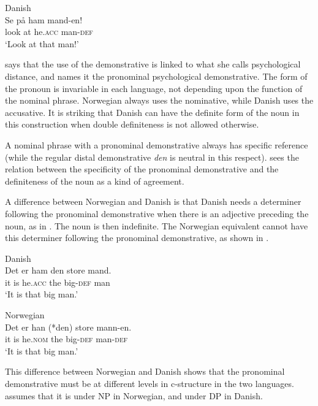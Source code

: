 \documentclass[output=paper,hidelinks]{langscibook}
\begin{document}
\ea\label{ex:Scandinavian:100} Danish \citep[193]{Strahan08}\\
\gll
 {Se} {på} {ham} {mand-en!}\\
 look at he.\textsc{acc} man-\textsc{def}\\
\glt `Look at that man!'\z

\noindent \citet{Johannessen08} says that the use of the demonstrative is linked to what she calls psychological distance, and names it the pronominal psychological demonstrative. The form of the pronoun is invariable in each language, not depending upon the function of the nominal phrase. Norwegian always uses the nominative, while Danish uses the accusative. It is striking that Danish can have the definite form of the noun in this construction when double definiteness is not allowed otherwise.

 A nominal phrase with a pronominal demonstrative always has specific reference (while the regular distal demonstrative \textit{den} is neutral in this respect). \citet{Strahan08} sees the relation between the specificity of the pronominal demonstrative and the definiteness of the noun as a kind of agreement.

 A difference between Norwegian and Danish is that Danish needs a determiner following the pronominal demonstrative when there is an adjective preceding the noun, as in . The noun is then indefinite. The Norwegian equivalent cannot have this determiner following the pronominal demonstrative, as shown in .



\ea\label{ex:Scandinavian:101} Danish \citep[213]{Strahan08}\\
\gll
 {Det} {er} {ham} {den} {store} {mand.}\\
 it is he.\textsc{acc} the big-\textsc{def} man\\
\glt `It is that big man.'\z



\ea\label{ex:Scandinavian:102} Norwegian\\
\gll
 {Det} {er} {han} {(*den)} {store} {mann-en.}\\
 it is he.\textsc{nom} the big-\textsc{def} man-\textsc{def}\\
\glt `It is that big man.'\z

\noindent This difference between Norwegian and Danish shows that the pronominal de\-mon\-stra\-tive must be at different levels in c-structure in the two languages. \citet{Strahan08} assumes that it is under NP in Norwegian, and under DP in Danish.
\end{document}
